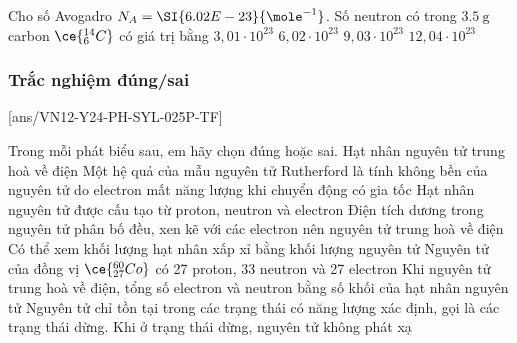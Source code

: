 \begin{ex}
	Cho số Avogadro $N_A=\SI{6.02E-23}{\mole^{-1}}$. Số neutron có trong $\SI{3.5}{\gram}$ carbon $\ce{_6^{14}C}$ có giá trị bằng
	\choice
	{$3,01 \cdot 10^{23}$}
	{$6,02 \cdot 10^{23}$}
	{$9,03\cdot10^{23}$}
	{\True $12,04\cdot10^{23}$}
\end{ex}


\subsubsection{Trắc nghiệm đúng/sai}
\setcounter{ex}{0}
[ans/VN12-Y24-PH-SYL-025P-TF]
\begin{ex}
	Trong mỗi phát biểu sau, em hãy chọn đúng hoặc sai.
	\choiceTFt
	{Hạt nhân nguyên tử trung hoà về điện}
	{\True Một hệ quả của mẫu nguyên tử Rutherford là tính không bền của nguyên tử do electron mất năng lượng khi chuyển động có gia tốc}
	{Hạt nhân nguyên tử được cấu tạo từ proton, neutron và electron}
	{Điện tích dương trong nguyên tử phân bố đều, xen kẽ với các electron nên nguyên tử trung hoà về điện}
	{\True Có thể xem khối lượng hạt nhân xấp xỉ bằng khối lượng nguyên tử}
	{\True Nguyên tử của đồng vị $\ce{_{27}^{60}Co }$ có 27 proton, 33 neutron và 27 electron}
	{\True Khi nguyên tử trung hoà về điện, tổng số electron và neutron bằng số khối của hạt nhân nguyên tử}
	{\True Nguyên tử chỉ tồn tại trong các trạng thái có năng lượng xác định, gọi là các trạng thái dừng. Khi ở trạng thái dừng, nguyên tử không phát xạ}
	\loigiai{}
\end{ex}

